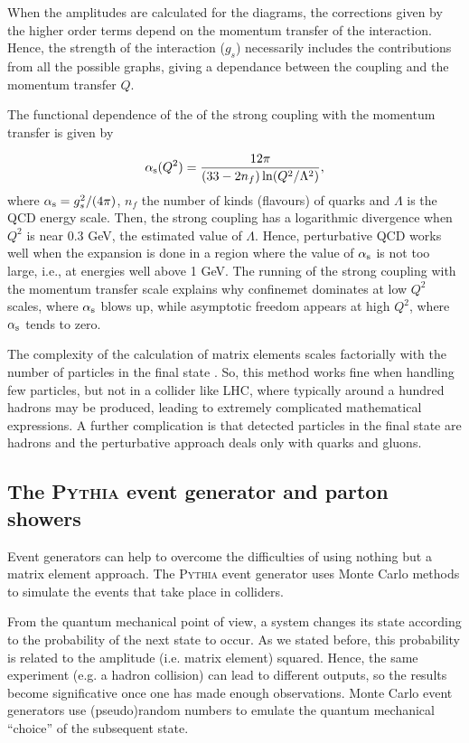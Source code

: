 \documentclass[a4paper,12pt]{article}
\begin{document}
When the amplitudes are calculated for the diagrams, the corrections given by the higher order terms depend on the momentum transfer of the interaction. Hence, the strength of the interaction ($g_s$) necessarily includes the contributions from all the possible graphs, giving a dependance between the coupling and the momentum transfer $Q$.

The functional dependence of the of the strong coupling with the momentum transfer is given by

\begin{equation}
\alpha_{\mathrm{s}}(Q^2) = \frac{12 \pi}{(33-2n_f)\ln(Q^2/\Lambda^2)},
\label{eq:alphastrong}
\end{equation}
where $\alpha_{\mathrm{s}}=g_s^2/(4\pi)$, $n_f$ the number of kinds (flavours) of quarks and $\Lambda$ is the QCD energy scale. Then, the strong coupling has a logarithmic divergence when $Q^2$ is near 0.3 GeV, the estimated value of $\Lambda$. Hence, perturbative QCD works well when the expansion is done in a region where the value of $\alpha_{\mathrm{s}}$ is not too large, i.e., at energies well above 1 GeV. The running of the strong coupling with the momentum transfer scale explains why confinemet dominates at low $Q^2$ scales, where $\alpha_{\mathrm{s}}$ blows up, while asymptotic freedom appears at high $Q^2$, where $\alpha_{\mathrm{s}}$ tends to zero.

The complexity of the calculation of matrix elements scales factorially with the number of particles in the final state \cite{Peskin:1995}. So, this method works fine when handling few particles, but not in a collider like LHC, where typically around a hundred hadrons may be produced, leading to extremely complicated mathematical expressions. A further complication is that detected particles in the final state are hadrons and the perturbative approach deals only with quarks and gluons.

\subsection{The \textsc{Pythia} event generator and parton showers}

Event generators can help to overcome the difficulties of using nothing but a matrix element approach. The \textsc{Pythia} event generator uses Monte Carlo methods to simulate the events that take place in colliders.

From the quantum mechanical point of view, a system changes its state according to the probability of the next state to occur. As we stated before, this probability is related to the amplitude (i.e. matrix element) squared. Hence, the same experiment (e.g. a hadron collision) can lead to different outputs, so the results become significative once one has made enough observations. Monte Carlo event generators use (pseudo)random numbers to emulate the quantum mechanical ``choice'' of the subsequent state.
\end{document}
